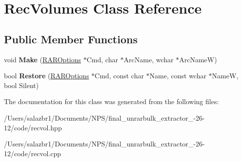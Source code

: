 \hypertarget{class_rec_volumes}{\section{Rec\-Volumes Class Reference}
\label{class_rec_volumes}
}
\subsection*{Public Member Functions}
\begin{DoxyCompactItemize}
\item 
\hypertarget{class_rec_volumes_a4c67e0e29250ea3383f594ac8b31e22f}{void {\bfseries Make} (\hyperlink{class_r_a_r_options}{R\-A\-R\-Options} $\ast$Cmd, char $\ast$Arc\-Name, wchar $\ast$Arc\-Name\-W)}\label{class_rec_volumes_a4c67e0e29250ea3383f594ac8b31e22f}

\item 
\hypertarget{class_rec_volumes_ad4fdf3ecc57f619ea464fe9ce0bc5e27}{bool {\bfseries Restore} (\hyperlink{class_r_a_r_options}{R\-A\-R\-Options} $\ast$Cmd, const char $\ast$Name, const wchar $\ast$Name\-W, bool Silent)}\label{class_rec_volumes_ad4fdf3ecc57f619ea464fe9ce0bc5e27}

\end{DoxyCompactItemize}


The documentation for this class was generated from the following files\-:\begin{DoxyCompactItemize}
\item 
/\-Users/salazbr1/\-Documents/\-N\-P\-S/final\-\_\-unrarbulk\-\_\-extractor\-\_-\/26-\/12/code/recvol.\-hpp\item 
/\-Users/salazbr1/\-Documents/\-N\-P\-S/final\-\_\-unrarbulk\-\_\-extractor\-\_-\/26-\/12/code/recvol.\-cpp\end{DoxyCompactItemize}
